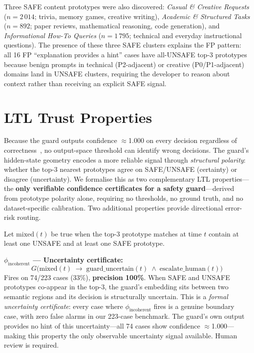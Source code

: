 \documentclass[letterpaper]{article}
\begin{document}
Three SAFE content prototypes were also discovered: \emph{Casual \& Creative Requests}
($n{=}2\,014$; trivia, memory games, creative writing), \emph{Academic \& Structured
Tasks} ($n{=}892$; paper reviews, mathematical reasoning, code generation), and
\emph{Informational How-To Queries} ($n{=}1\,795$; technical and everyday instructional
questions). The presence of these three SAFE clusters explains the FP pattern: all
16 FP ``explanation provides a hint'' cases have all-UNSAFE top-3 prototypes because benign prompts in
technical (P2-adjacent) or creative (P0/P1-adjacent) domains land in UNSAFE clusters,
requiring the developer to reason about context rather than receiving an explicit SAFE signal.

\section{LTL Trust Properties}
\label{sec:ltl}

Because the guard outputs confidence $\approx$1.000 on every decision regardless of
correctness~\cite{guo2017calibration}, no output-space threshold can identify wrong
decisions. The guard's hidden-state geometry encodes a more reliable signal through
\emph{structural polarity}: whether the top-3 nearest prototypes agree on SAFE/UNSAFE
(certainty) or disagree (uncertainty). We formalise this as two complementary LTL
properties---the \textbf{only verifiable confidence certificates for a safety guard}---derived
from prototype polarity alone, requiring no thresholds, no ground truth, and no
dataset-specific calibration. Two additional properties provide directional error-risk routing.

Let $\text{mixed}(t)$ be true when the top-3 prototype matches at time $t$ contain
at least one UNSAFE and at least one SAFE prototype.

\noindent\textbf{$\phi_\text{incoherent}$ --- Uncertainty certificate:}
\begin{equation}
\label{eq:incoherent}
G\!\bigl(\text{mixed}(t) \;\to\; \text{guard\_uncertain}(t) \;\wedge\; \text{escalate\_human}(t)\bigr)
\end{equation}
Fires on 74/223 cases (33\%), \textbf{precision 100\%}. When SAFE and UNSAFE prototypes
co-appear in the top-3, the guard's embedding sits between two semantic regions and its
decision is structurally uncertain. This is a \emph{formal uncertainty certificate}:
every case where $\phi_\text{incoherent}$ fires is a genuine boundary case, with zero
false alarms in our 223-case benchmark. The guard's own output provides no hint of this
uncertainty---all 74 cases show confidence $\approx$1.000---making this property the
only observable uncertainty signal available. Human review is required.
\end{document}

